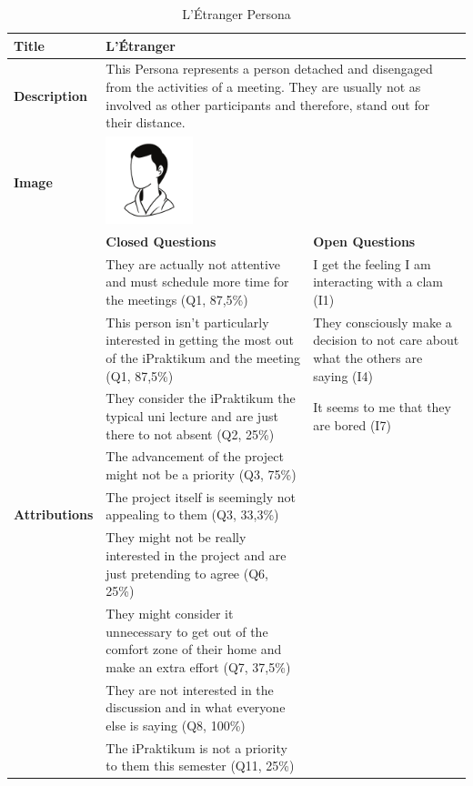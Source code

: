\begin{longtable}[ht]{ p{}  p{} p{} }
\caption{L'Étranger Persona}
\label{tab:theDetached}\\
\hline
\textbf{Title} & L'Étranger \\
    \hline
   \textbf{Description} &  \multicolumn{2}{p{.80\textwidth}}{This Persona represents a person detached and disengaged from the activities of a meeting. They are usually not as involved as other participants and therefore, stand out for their distance.} \\
   \hline
   \textbf{Image} &  \includegraphics[valign=t, width=1in, margin=0pt 3pt 0pt 3pt]{figures/TheStranger.png} \\
   \hline
    & \textbf{Closed Questions} & \textbf{Open Questions} \\
    \hline
    \multirow{10}{3cm}{\textbf{Attributions}}  & They are actually not attentive and must schedule more time for the meetings (Q1, 87,5\%) & I get the feeling I am interacting with a clam (I1)  \\
     & This person isn't particularly interested in getting the most out of the iPraktikum and the meeting (Q1, 87,5\%) & They consciously make a decision to not care about what the others are saying (I4) \\
     & They consider the iPraktikum the typical uni lecture and are just there to not absent (Q2, 25\%) & It seems to me that they are bored (I7) \\
     & The advancement of the project might not be a priority (Q3, 75\%) \\
     & The project itself is seemingly not appealing to them (Q3, 33,3\%) \\
 	 & They might not be really interested in the project and are just pretending to agree (Q6, 25\%)  \\
 	 & They might consider it unnecessary to get out of the comfort zone of their home and make an extra effort (Q7, 37,5\%) \\
 	 & They are not interested in the discussion and in what everyone else is saying (Q8, 100\%) \\
 	 & The iPraktikum is not a priority to them this semester (Q11, 25\%) \\

\end{longtable}
